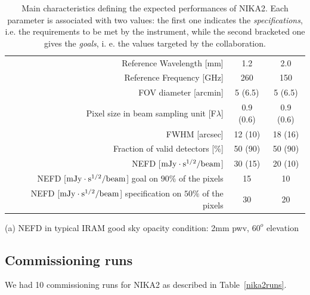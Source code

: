 \documentclass[a4paper, 11pt]{article} %
\begin{document}
\begin{table}[ht]
\begin{center}
\begin{threeparttable}
\begin{tabular}{|r|c|c|}
  \hline
  \hline
Reference Wavelength  [mm]  &  1.2 & 2.0  \\
Reference Frequency  [GHz]  &  260 & 150  \\
\hline  
\hline
FOV diameter [arcmin]       &  5 (6.5)    &  5 (6.5)   \\
Pixel size in beam sampling unit [F$\lambda$]  &  0.9 (0.6)   &   0.9 (0.6)  \\
FWHM  [arcsec]              &  12 (10)   &  18 (16) \\
Fraction of valid detectors [$\%$] &  50 (90)   &  50 (90) \\
NEFD\tnote{a}\hspace{1mm}   [$\rm{mJy} \cdot \rm{s}^{1/2}/\rm{beam}$]  &  30 (15)   &  20 (10) \\
\hline
NEFD [$\rm{mJy} \cdot \rm{s}^{1/2}/\rm{beam}$] goal on $90\%$ of the pixels  &  15  & 10 \\
NEFD [$\rm{mJy} \cdot \rm{s}^{1/2}/\rm{beam}$] specification on $50\%$ of the pixels  &  30  &  20  \\
\hline
\end{tabular}
\begin{tablenotes}
  \item[(a)] NEFD in typical IRAM good sky opacity condition: 2mm pwv, $60^o$ elevation
\end{tablenotes}
\end{threeparttable}
\caption{Main characteristics defining the expected performances of NIKA2. Each parameter is associated with two values: the first one indicates the \emph{specifications}, i.e. the requirements to be met by the instrument, while the second bracketed one gives the \emph{goals}, i. e. the values targeted by the collaboration.}
\label{nika2specs}
\end{center}
\end{table} 


\subsection{Commissioning runs}
We had 10 commissioning runs for NIKA2 as described in Table~\ref{nika2runs}.
\end{document}
